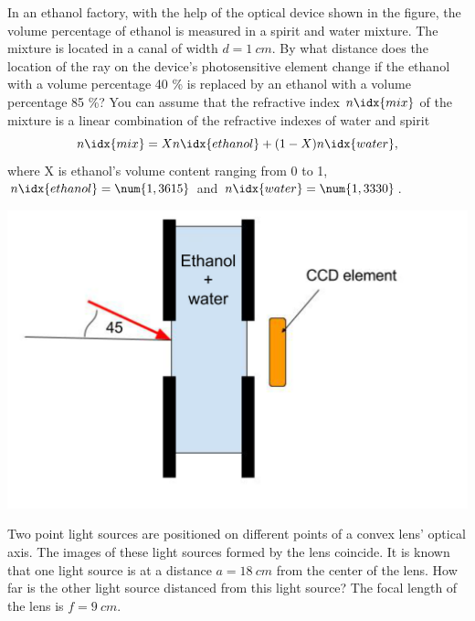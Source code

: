 \documentclass[11pt]{article}
\begin{document}
\probeng
In an ethanol factory, with the help of the optical device shown in the figure, the volume percentage of ethanol is measured in a spirit and water mixture. The mixture is located in a canal of width $d=\SI{1}{cm}$. By what distance does the location of the ray on the device's photosensitive element change if the ethanol with a volume percentage 40 \% is replaced by an ethanol with a volume percentage 85 \%? You can assume that the refractive index $n\idx{mix}$ of the mixture is a linear combination of the refractive indexes of water and spirit
$$
n\idx{mix}=Xn\idx{ethanol}+(1-X)n\idx{water},
$$
where X is ethanol’s volume content ranging from 0 to 1, $n\idx{ethanol}=\num{1,3615}$ and $n\idx{water}=\num{1,3330}$.
\begin{center}
	\vspace{-0pt}
	\includegraphics[width=0.5\linewidth]{2017-v2g-04-Piiritusetehas_ing}
	\vspace{-10pt}
\end{center}
\probend
\bigskip


\probeng
Two point light sources are positioned on different points of a convex lens’ optical axis. The images of these light sources formed by the lens coincide. It is known that one light source is at a distance $a=\SI{18}{cm}$ from the center of the lens. How far is the other light source distanced from this light source? The focal length of the lens is $f=\SI{9}{cm}$.
\probend
\bigskip

\end{document}
